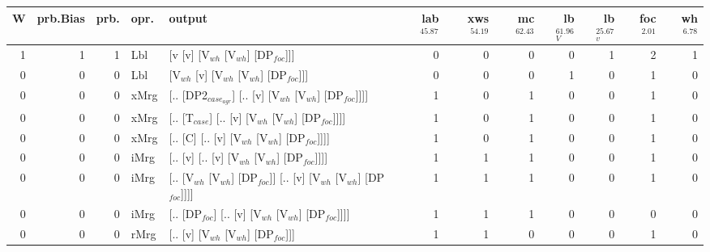 \begin{tabularx}{\linewidth}{rrrlXrrrrrrr}
\hline
   W &   prb.Bias &   prb. & opr.   & output                                                      &   lab$^{45.87}$ &   xws$^{54.19}$ &   mc$^{62.43}$ &   lb$_{V}^{61.96}$ &   lb$_{v}^{25.67}$ &   foc$^{2.01}$ &   wh$^{6.78}$ \\
\hline
   1 &       1 &   1 & Lbl  & [v [v] [V$_{wh}$ [V$_{wh}$] [DP$_{foc}$]]]                              &             0 &             0 &            0 &              0 &              1 &          2 &        1 \\
   0 &       0 &   0 & Lbl  & [V$_{wh}$ [v] [V$_{wh}$ [V$_{wh}$] [DP$_{foc}$]]]                           &             0 &             0 &            0 &              1 &              0 &          1 &        0 \\
   0 &       0 &   0 & xMrg & [.. [DP2$_{case_{agr}}$] [.. [v] [V$_{wh}$ [V$_{wh}$] [DP$_{foc}$]]]]         &             1 &             0 &            1 &              0 &              0 &          1 &        0 \\
   0 &       0 &   0 & xMrg & [.. [T$_{case}$] [.. [v] [V$_{wh}$ [V$_{wh}$] [DP$_{foc}$]]]]               &             1 &             0 &            1 &              0 &              0 &          1 &        0 \\
   0 &       0 &   0 & xMrg & [.. [C] [.. [v] [V$_{wh}$ [V$_{wh}$] [DP$_{foc}$]]]]                    &             1 &             0 &            1 &              0 &              0 &          1 &        0 \\
   0 &       0 &   0 & iMrg & [.. [v] [.. [v] [V$_{wh}$ [V$_{wh}$] [DP$_{foc}$]]]]                    &             1 &             1 &            1 &              0 &              0 &          1 &        0 \\
   0 &       0 &   0 & iMrg & [.. [V$_{wh}$ [V$_{wh}$] [DP$_{foc}$]] [.. [v] [V$_{wh}$ [V$_{wh}$] [DP$_{foc}$]]]] &             1 &             1 &            1 &              0 &              0 &          1 &        0 \\
   0 &       0 &   0 & iMrg & [.. [DP$_{foc}$] [.. [v] [V$_{wh}$ [V$_{wh}$] [DP$_{foc}$]]]]               &             1 &             1 &            1 &              0 &              0 &          0 &        0 \\
   0 &       0 &   0 & rMrg & [.. [v] [V$_{wh}$ [V$_{wh}$] [DP$_{foc}$]]]                             &             1 &             1 &            0 &              0 &              0 &          1 &        0 \\
\hline
\end{tabularx}\endgroup\\
